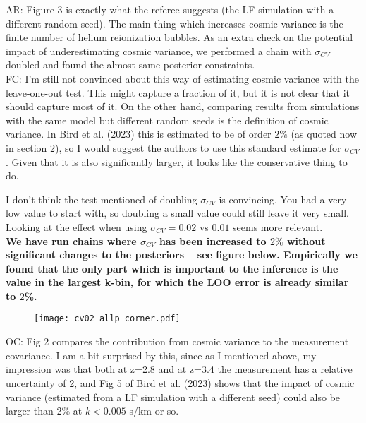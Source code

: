 \documentclass[12pt]{article}
\begin{document}
AR: Figure 3 is exactly what the referee suggests (the LF simulation with a different random seed). The main thing which increases cosmic variance is the finite number of helium reionization bubbles. As an extra check on the potential impact of underestimating cosmic variance, we performed a chain with $\sigma_{CV}$ doubled and found the almost same posterior constraints.\\

FC: I’m still not convinced about this way of estimating cosmic variance with the leave-one-out test. This might capture a fraction of it, but it is not clear that it should capture most of it. On the other hand, comparing results from simulations with the same model but different random seeds is the definition of cosmic variance. In Bird et al. (2023) this is estimated to be of order $2\%$ (as quoted now in section 2), so I would suggest the authors to use this standard estimate for $\sigma_{CV}$. Given that it is also significantly larger, it looks like the conservative thing to do.

I don’t think the test mentioned of doubling $\sigma_{CV}$ is convincing. You had a very low value to start with, so doubling a small value could still leave it very small. Looking at the effect when using $\sigma_{CV} = 0.02$ vs $0.01$ seems more relevant.\\

\textbf{We have run chains where $\sigma_{CV}$ has been increased to $2\%$ without significant changes to the posteriors -- see figure below. Empirically we found that the only part which is important to the inference is the value in the largest k-bin, for which the LOO error is already similar to $2$\%.}

\begin{figure}[h!]
    \centering
    \texttt{[image: cv02\_allp\_corner.pdf]}
\end{figure}

\hrulefill \newline

OC: Fig 2 compares the contribution from cosmic variance to the measurement covariance. I am a bit surprised by this, since as I mentioned above, my impression was that both at z=2.8 and at z=3.4 the measurement has a relative uncertainty of 2, and Fig 5 of Bird et al. (2023) shows that the impact of cosmic variance (estimated from a LF simulation with a different seed) could also be larger than $2\%$ at $k < 0.005$ s/km or so.\\
\end{document}
